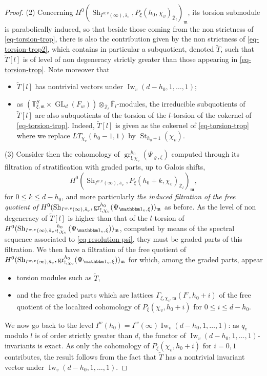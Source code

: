 \documentclass[JEP,XML,SOM,Unicode,published]{cedram}
\let\mathds\mathbbm
\newcommand{\NoChangel}[1]{%
\expandafter\let\csname old\string#1\endcsname=#1
\let#1=\relax
\newcommand{#1}{\mathcode`l="716C\csname old\string#1\endcsname\mathcode`l="7160 }%
}
\DeclareMathOperator{\GL}{GL}
\theoremstyle{plain}
\theoremstyle{definition}
\numberwithin{equation}{subsection}
\newcommand\Tm{{\mathbb T}}
\newcommand\Fm{{\mathbb F}}
\newcommand\Zm{{\mathbb Z}}
\DeclareMathOperator{\sh}{Sh}
\DeclareMathOperator{\Iw}{Iw}
\DeclareMathOperator{\st}{St}
\DeclareMathOperator{\gr}{gr}
\DeclareMathOperator{\Fil}{Fil}\NoChangel{\Fil}
\let \oo=\infty
\begin{document}
\begin{proof}
(2) Concerning $H^0(\sh_{I^{w,v}(\oo),\bar s_v},
P_\xi(h_0,\chi_v)_{\overline \Zm_l})_{\mathfrak m}$,
its torsion submodule is
parabolically induced, so that beside those coming from the non strictness of \eqref{eq-torsion-trop},
there is also the contribution given by the non strictness of \eqref{eq-torsion-trop2}, which
contains in particular a subquotient, denoted $\widetilde T$,
such that $\widetilde T[l]$ is of level of non degeneracy strictly greater than those appearing
in \eqref{eq-torsion-trop}. Note moreover that
\begin{itemize}
\item $\widetilde T[l]$ has nontrivial vectors under $\Iw_v(d-h_0,1,\dots,1)$;

\item as $(\Tm^S_{\xi,\mathfrak m} \times \GL_d(F_w)) \otimes_{\overline \Zm_l} \overline \Fm_l$-modules, the irreducible subquotients of
$\widetilde T[l]$ are also subquotients of the torsion of the $l$-torsion of the
cokernel of \eqref{eq-torsion-trop}. Indeed, $\widetilde T[l]$ is given as the cokernel
of \eqref{eq-torsion-trop} where we replace $LT_{\chi_v}(h_0-1,1)$ by
$\st_{h_0+1}(\chi_v)$.
\end{itemize}

(3) Consider then the cohomology of $\gr^{h_0}_{!,\chi_v}(\Psi_{\varrho,\xi})$
computed through
its filtration of stratification with graded parts, up to Galois shifts,
\[
H^0(\sh_{I^{w,v}(\oo),\bar s_v},P_\xi(h_0+k,\chi_v)_{\overline \Zm_l})_{\mathfrak m},
\]
for $0 \leq k \leq d-h_0$,
and more particularly \emph{the induced filtration of the free quotient of}
$H^0(\sh_{I^{w,v}(\oo),\bar s_v},\gr^{h_0}_{!,\chi_v}(\Psi_{\mathds 1_v,\xi}))_{\mathfrak m}$ as before.
As the level of non degeneracy of $\widetilde T[l]$ is higher than that of the $l$-torsion
of $H^0(\sh_{I^{w,v}(\oo),\bar s_v},\Fil^{h_0}_{!,\chi_v}
(\Psi_{\mathds 1_v,\xi}))_{\mathfrak m}$,
computed by means of the spectral sequence associated to \eqref{eq-resolution-psi},
they must be graded parts of this filtration.
We then have a filtration of the free quotient of $H^0(\sh_{I^{w,v}(\oo),\bar s_v},
\gr^{h_0}_{!,\chi_v}(\Psi_{\mathds 1_v,\xi}))_{\mathfrak m}$ for which, among the graded parts, appear
\begin{itemize}
\item torsion modules such as $\widetilde T$,

\item and the free graded parts which are lattices
$\Gamma_{\xi,\chi_v,\mathfrak m}(I^v,h_0+i)$
of the free quotient of the localized cohomology of $P_\xi(\chi_v,h_0+i)$
for $0 \leq i \leq d-h_0$.
\end{itemize}
We now go back to the level $I^w(h_0)=I^w(\oo)\Iw_v(d-h_0,1,\dots,1)$:
as $q_v$ modulo $l$ is of order strictly
greater than $d$, the functor of $\Iw_v(d-h_0,1,\dots,1)$-invariants
is exact. As only the
cohomology of $P_\xi(\chi_v,h_0+i)$ for $i=0,1$ contributes, the result follows from
the fact that $\widetilde T$ has a nontrivial invariant vector under $\Iw_v(d-h_0,1,\dots,1)$.
\end{proof}
\end{document}
